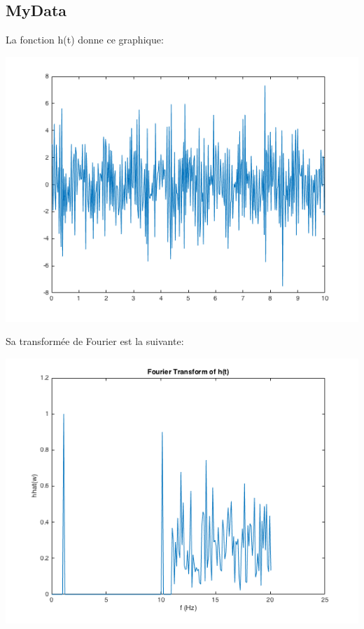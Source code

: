 \documentclass[a4paper,11pt]{article}
\begin{document}
\subsection{MyData}
La fonction h(t) donne ce graphique:
\begin{center}
\includegraphics[scale=0.6]{"h_raw.png"} \newline
\end{center}
Sa transformée de Fourier est la suivante:
\begin{center}
\includegraphics[scale=0.6]{"hhat_raw.png"} \newline
\end{center}
\end{document}
